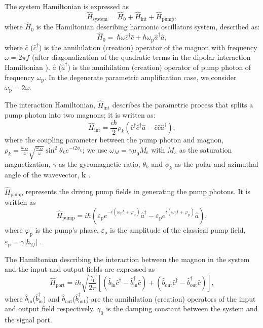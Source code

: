 \documentclass[%
 reprint,
 amsmath,amssymb,
 aps,
prb,
]{revtex4-2}
\begin{document}
The system Hamiltonian is expressed as \cite{Walls}
\begin{equation}
    \hat{H}_{\mathrm{system}}={\hat{H}}_0+{\hat{H}}_{\mathrm{int}}+{\hat{H}}_{\mathrm{pump}},
\end{equation}
where ${\hat{H}}_0$ is the Hamiltonian describing harmonic oscillators system, described as:
\begin{equation}
    {\hat{H}}_0=\ \hbar\omega{\hat{c}}^\dag{\hat{c}}+\hbar\omega_\mathrm{p}{\hat{a}}^\dag{\hat{a}},			
\end{equation}
where $\hat{c}$ ($\hat{c}^\dag$) is the annihilation (creation) operator of the magnon with frequency $\omega=2\pi f$ (after diagonalization of the quadratic terms in the dipolar interaction Hamiltonian \cite{Rez}). ${\hat{a}}$ ($\hat{a}^\dag$) is the annihilation (creation) operator of pump photon of frequency $\omega_\mathrm{p}$. In the degenerate parametric amplification case, we consider  $\omega_\mathrm{p}=2\omega$. 

The interaction Hamiltonian, ${\hat{H}}_{\mathrm{int}}$ describes the parametric process that splits a pump photon into two magnons; it is written as:
\begin{equation}
   {\hat{H}}_\mathrm{int}=\frac{i\hbar}{2}\rho_k\left({\hat{c}}^\dag{\hat{c}}^\dag{\hat{a}}-{\hat{c}}{\hat{c}}{\hat{a}}^\dag\right),	 
\end{equation}
where the coupling parameter between the pump photon and magnon, $\rho_k=\frac{\omega_M}{4} \sqrt{\frac{\omega_M}{\omega}}\sin^2{\theta_ke^{-i2\phi_k}}$; we use $\omega_M= \gamma \mu_0 M_\mathrm{s} $ with $M_s$ as the saturation magnetization, $\gamma$ as the gyromagnetic ratio, $\theta_k$ and $\phi_k$ as the polar and azimuthal angle of the wavevector, $\mathbf{k}$ \cite{Rez}. 

${\hat{H}}_{\mathrm{pump}}$ represents the driving pump fields in generating  the pump photons. It is written as 
\begin{equation}        {\hat{H}}_{\mathrm{pump}}=i\hbar\left(\varepsilon_\mathrm{p}e^{-i\left(\omega_\mathrm{p}t+\varphi_\mathrm{p}\right)}{\hat{a}}^\dag-{\varepsilon_\mathrm{p}e}^{i\left(\omega_\mathrm{p}t+\varphi_\mathrm{p}\right)}{\hat{a}}\right),
\end{equation}
where $\varphi_\mathrm{p}$ is the pump’s phase, $\varepsilon_\mathrm{p}$ is the amplitude of the classical pump field, $\varepsilon_\mathrm{p}= \gamma |h_{2f}|$ . 

The Hamiltonian describing the interaction between the magnon in the system and the input and output fields are expressed as
\begin{equation}     {\hat{H}}_{\mathrm{port}}=i\hbar\sqrt{\frac{\gamma_\mathrm{0}}{2\pi}}\left[\left({\hat{b}}_{\mathrm{in}}{\hat{c}}^\dag-{{\hat{b}}_{\mathrm{in}}^\dag{\hat{c}}}\right)+\left({\hat{b}}_{\mathrm{out}}{\hat{c}}^\dag-{{\hat{b}}_{\mathrm{out}}^\dag{\hat{c}}}\right)\right], 
\end{equation}
where ${\hat{b}}_{\mathrm{in}}$(${\hat{b}}_{\mathrm{in}}^\dag$) and ${\hat{b}}_{\mathrm{out}}$(${\hat{b}}_{\mathrm{out}}^\dag$) are the annihilation (creation) operators of the input and output field respectively. $\gamma_0$ is the damping constant between the system and the signal port. 
\end{document}
